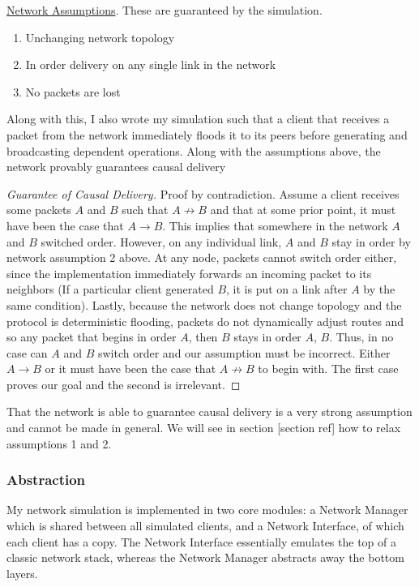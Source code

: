 \documentclass[12pt,a4paper,twoside,openright]{report}
\begin{document}
		\underline{Network Assumptions}. These are guaranteed by the simulation.
		\begin{enumerate}
			\item Unchanging network topology
			\item In order delivery on any single link in the network
			\item No packets are lost
		\end{enumerate}
		
		Along with this, I also wrote my simulation such that a client that receives a packet from the network immediately floods it to its peers before generating and broadcasting dependent operations. Along with the assumptions above, the network provably guarantees causal delivery
		
		\begin{proof}[Guarantee of Causal Delivery]
			Proof by contradiction. Assume a client receives some packets $A$ and $B$ such that $A \not\rightarrow B$ and that at some prior point, it must have been the case that $A \rightarrow B$. This implies that somewhere in the network $A$ and $B$ switched order. However, on any individual link, $A$ and $B$ stay in order by network assumption 2 above. At any node, packets cannot switch order either, since the implementation immediately forwards an incoming packet to its neighbors (If a particular client generated $B$, it is put on a link after $A$ by the same condition). Lastly, because the network does not change topology and the protocol is deterministic flooding, packets do not dynamically adjust routes and so any packet that begins in order $A$, then $B$ stays in order $A$, $B$. Thus, in no case can $A$ and $B$ switch order and our assumption must be incorrect. Either $A \rightarrow B$ or it must have been the case that $A \not\rightarrow B$ to begin with. The first case proves our goal and the second is irrelevant.
		\end{proof}
		
		That the network is able to guarantee causal delivery is a very strong assumption and cannot be made in general. We will see in section [section ref] how to relax assumptions 1 and 2.
		
		\subsubsection{Abstraction}
		My network simulation is implemented in two core modules: a Network Manager which is shared between all simulated clients, and a Network Interface, of which each client has a copy. The Network Interface essentially emulates the top of a classic network stack, whereas the Network Manager abstracts away the bottom layers.
		
\end{document}

